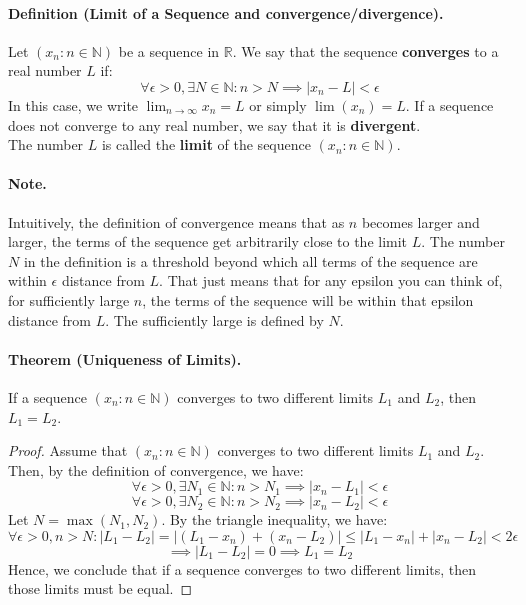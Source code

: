\documentclass[openany]{book}
\numberwithin{equation}{section}
\begin{document}
\paragraph{Definition (Limit of a Sequence and convergence/divergence).}

    Let $(x_n : n \in \mathbb{N})$ be a sequence in $\mathbb{R}$. We say that the sequence \textbf{converges} to a real number $L$ if:
    $$\forall \epsilon > 0, \exists N \in \mathbb{N}: n > N \implies |x_n - L| < \epsilon$$
    In this case, we write $\lim_{n \to \infty} x_n = L$ or simply $\lim(x_n) = L$. If a sequence does not converge to any real number, we say that it is \textbf{divergent}. \\
    The number $L$ is called the \textbf{limit} of the sequence $(x_n : n \in \mathbb{N})$.
\par
\paragraph{Note.}

    Intuitively, the definition of convergence means that as $n$ becomes larger and larger, the terms of the sequence get arbitrarily close to the limit $L$. The number $N$ in the definition is a threshold beyond which all terms of the sequence are within $\epsilon$ distance from $L$. That just means that for any epsilon you can think of, for sufficiently large $n$, the terms of the sequence will be within that epsilon distance from $L$. The sufficiently large is defined by $N$.
\par
\paragraph{Theorem (Uniqueness of Limits).}

    If a sequence $(x_n : n \in \mathbb{N})$ converges to two different limits $L_1$ and $L_2$, then $L_1 = L_2$.
\par
\begin{proof}
    Assume that $(x_n : n \in \mathbb{N})$ converges to two different limits $L_1$ and $L_2$. Then, by the definition of convergence, we have:
    $$\forall \epsilon > 0, \exists N_1 \in \mathbb{N}: n > N_1 \implies |x_n - L_1| < \epsilon$$
    $$\forall \epsilon > 0, \exists N_2 \in \mathbb{N}: n > N_2 \implies |x_n - L_2| < \epsilon$$
    Let $N = \max(N_1, N_2)$.
    By the triangle inequality, we have:
    $$\forall \epsilon > 0, n>N: |L_1 - L_2| = |(L_1 - x_n) + (x_n - L_2)| \leq |L_1 - x_n| + |x_n - L_2| < 2\epsilon$$ 
    $$\implies \left| L_1 -L_2 \right| = 0 \implies L_1 = L_2$$
    Hence, we conclude that if a sequence converges to two different limits, then those limits must be equal.
\end{proof}
\end{document}
